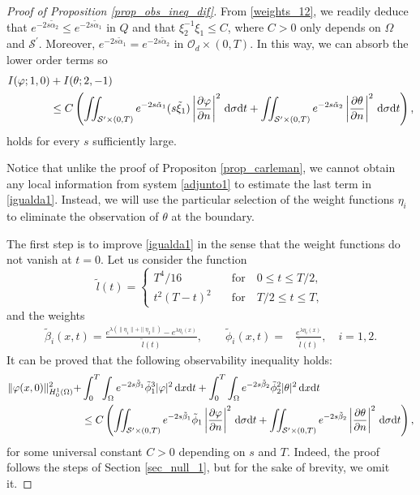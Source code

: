\documentclass[preprint,10pt]{article}
\numberwithin{equation}{section}
\numberwithin{theorem}{section}
\def\dx{\,\textnormal{d}x}
\def\dt{\textnormal{d}t}
\def\d{\,\textnormal{d}}
\def\dx{\,\textnormal{d}x}
\def\dt{\textnormal{d}t}
\def\d{\,\textnormal{d}}
\begin{document}
{\begin{proof}[Proof of Proposition \ref{prop_obs_ineq_dif}]
From \eqref{weights_12}, we readily deduce that $e^{-2s\tilde\alpha_2}\leq e^{-2s\tilde\alpha_1}$ in $Q$ and that $\xi_2^{-1}\xi_1\leq C$, where $C>0$ only depends on $\Omega$ and $\mathcal S^\prime$. Moreover, $e^{-2s\tilde\alpha_1}=e^{-2s\tilde\alpha_2}$ in  $\mathcal O_d\times(0,T)$. In this way, we can absorb the lower order terms so 
\begin{align}\notag
I(\varphi;1,0)&+I(\theta;2, -1)\\ \label{igualda1}
&\leq C\left(\iint_{\mathcal S^{\prime}\times(0,T)}e^{-2s\tilde{\alpha}_1}(s\tilde{\xi}_1)\left|\frac{\partial \varphi}{\partial n}\right|^2\d\sigma\dt+\iint_{\mathcal S^\prime\times(0,T)}e^{-2s\tilde{\alpha}_2}\left|\frac{\partial \theta}{\partial n}\right|^2\d\sigma\dt\right),
\end{align}
holds for every $s$ sufficiently large.

 Notice that unlike the proof of Propositon \ref{prop_carleman}, we cannot obtain any local information from system \eqref{adjunto1} to estimate the last term in \eqref{igualda1}. Instead, we will use the particular selection of the weight functions $\eta_i$ to eliminate the observation of $\theta$ at the boundary.
 
 The first step is to improve \eqref{igualda1} in the sense that the weight functions do not vanish at $t=0$. Let us consider the function
 \begin{equation*}
 \widetilde{l}(t)=
 \begin{cases}
 T^4/16 \quad &\text{for}\quad 0\leq t\leq T/2, \\
 t^2(T-t)^2 \quad &\text{for}\quad T/2\leq t\leq T,
 \end{cases}
 \end{equation*}
 and the weights
 \begin{equation*}
\begin{split}
\tilde{\beta}_i(x,t)=\frac{e^{\lambda(\|\eta_1\|+\|\eta_2\|)}-e^{\lambda \eta_i(x)}}{\widetilde{l}(t)}, \qquad \tilde{\phi}_i(x,t)=&\frac{e^{\lambda\eta_i(x)}}{\widetilde{l}(t)}, \quad i=1,2.
\end{split}\end{equation*}
It can be proved that the following observability inequality holds:
\begin{equation}
\label{aux7}
\begin{split}
\|\varphi(x,0)\|_{H_0^1(\Omega)}^2+&\int_0^{T}\int_{\Omega}e^{-2s\tilde \beta_1}\tilde \phi_1^{3}|\varphi|^2\dx\dt+\int_0^{T}\int_{\Omega}e^{-2s\tilde \beta_2}\tilde \phi_2^{2}|\theta|^2\dx\dt\\
&\leq C\left(\iint_{\mathcal S^\prime\times(0,T)}e^{-2s\tilde \beta_1}\tilde \phi_1\left|\frac{\partial \varphi}{\partial n}\right|^2\d\sigma\dt+\iint_{\mathcal S^{\prime}\times(0,T)}e^{-2s\tilde \beta_2}\left|\frac{\partial \theta}{\partial n}\right|^2\d\sigma\dt\right),
\end{split}
\end{equation}
 for some universal constant $C>0$ depending on $s$ and $T$. Indeed, the proof follows the steps of Section \ref{sec_null_1}, but for the sake of brevity, we omit it. 
 

\end{proof}}
\end{document}

